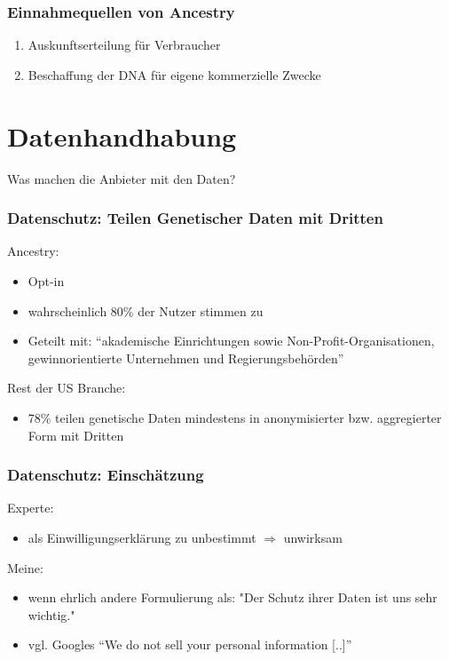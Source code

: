 \documentclass{beamer}
\begin{document}
\begin{frame}
  \frametitle{Einnahmequellen von Ancestry\autocite{ancestryGER}}

  \begin{enumerate}
    \item Auskunftserteilung für Verbraucher
    \item Beschaffung der DNA für eigene kommerzielle Zwecke
  \end{enumerate}
\end{frame}

\section{Datenhandhabung}
\begin{frame}
  \begin{center}
    {\Huge Was machen die Anbieter mit den Daten?}
  \end{center}
\end{frame}

\begin{frame}
  \frametitle{Datenschutz: Teilen Genetischer Daten mit Dritten}

  Ancestry:
  \begin{itemize}
    \item Opt-in
    \item wahrscheinlich 80\% der Nutzer stimmen zu\autocite{bbc}
    \item Geteilt mit:
      ``akademische Einrichtungen sowie Non-Profit-Organisationen, gewinnorientierte Unternehmen und Regierungsbehörden''\autocite{bigbro}
  \end{itemize}

  Rest der US Branche:
  \begin{itemize}
    \item 78\% teilen genetische Daten mindestens in anonymisierter bzw. aggregierter Form mit Dritten\autocite{privacyCompare}
  \end{itemize}
\end{frame}

\begin{frame}
  \frametitle{Datenschutz: Einschätzung}

  Experte:
  \begin{itemize}
    \item als Einwilligungserklärung zu unbestimmt $\Rightarrow$ unwirksam\autocite{ancestryGER}
  \end{itemize}

  \medskip

  Meine:
  \begin{itemize}
    \item wenn ehrlich andere Formulierung als: "Der Schutz ihrer Daten ist uns sehr wichtig."\autocite{ancestryGER}
    \item vgl. Googles ``We do not sell your personal information [..]''\autocite{effGoogle}
  \end{itemize}
\end{frame}
\end{document}
